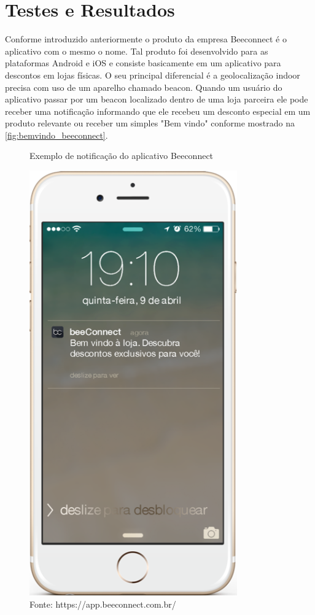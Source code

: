 \chapter{Testes e Resultados}
\label{cha:testes_e_resultados}
Conforme introduzido anteriormente o produto da empresa Beeconnect é o aplicativo com o mesmo o nome. Tal produto foi desenvolvido para as plataformas Android e iOS e consiste basicamente em um aplicativo para descontos em lojas físicas. O seu principal diferencial é a geolocalização indoor precisa com uso de um aparelho chamado beacon. Quando um usuário do aplicativo passar por um beacon localizado dentro de uma loja parceira ele pode receber uma notificação informando que ele recebeu um desconto especial em um produto relevante ou receber um simples "Bem vindo" conforme mostrado na \autoref{fig:bemvindo_beeconnect}.

\begin{figure}[H]
\caption{Exemplo de notificação do aplicativo Beeconnect}
\centerline{\includegraphics[scale=0.35]{img/bemvindo_beeconnect}}
\label{fig:bemvindo_beeconnect}
\caption* {Fonte: https://app.beeconnect.com.br/}
\end{figure}

